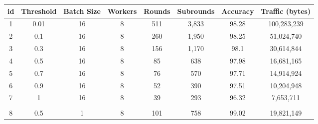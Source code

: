 \newpage

\begin{table}[H]
    \begin{tabular}{|c|c|c|c|c|c|c|c|}
        \hline
        \textbf{id}            & \textbf{Threshold}    & \textbf{Batch Size}   & \textbf{Workers}      & \textbf{Rounds}       & \textbf{Subrounds}    & \textbf{Accuracy}     & \textbf{Traffic (bytes)} \\
        \hline
        1                      & 0.01                  & 16                    & 8                     & 511                   & 3,833                 & 98.28                 & 100,283,239              \\
        2                      & 0.1                   & 16                    & 8                     & 260                   & 1,950                 & 98.25                 & 51,024,740               \\
        3                      & 0.3                   & 16                    & 8                     & 156                   & 1,170                 & 98.1                  & 30,614,844               \\
        4                      & 0.5                   & 16                    & 8                     & 85                    & 638                   & 97.98                 & 16,681,165               \\
        5                      & 0.7                   & 16                    & 8                     & 76                    & 570                   & 97.71                 & 14,914,924               \\
        6                      & 0.9                   & 16                    & 8                     & 52                    & 390                   & 97.51                 & 10,204,948               \\
        7                      & 1                     & 16                    & 8                     & 39                    & 293                   & 96.32                 & 7,653,711                \\
        \hline
        \multicolumn{1}{|l|}{} & \multicolumn{1}{l|}{} & \multicolumn{1}{l|}{} & \multicolumn{1}{l|}{} & \multicolumn{1}{l|}{} & \multicolumn{1}{l|}{} & \multicolumn{1}{l|}{} & \multicolumn{1}{l|}{}    \\
        \hline
        8                      & 0.5                   & 1                     & 8                     & 101                   & 758                   & 99.02                 & 19,821,149               \\

\end{tabular}
\end{table}
